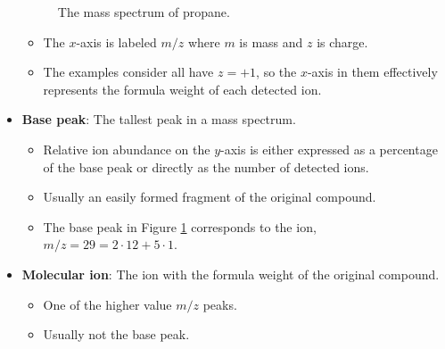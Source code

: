 \documentclass[../notes.tex]{subfiles}
\begin{document}
\begin{itemize}
\begin{figure}[h!]
        \caption{The mass spectrum of propane.}
        \label{fig:MSpropane}
    \end{figure}
    \begin{itemize}
        \item The $x$-axis is labeled $m/z$ where $m$ is mass and $z$ is charge.
        \item The examples \textcite{bib:SolomonsEtAl} consider all have $z=+1$, so the $x$-axis in them effectively represents the formula weight of each detected ion.
    \end{itemize}
    \item \textbf{Base peak}: The tallest peak in a mass spectrum.
    \begin{itemize}
        \item Relative ion abundance on the $y$-axis is either expressed as a percentage of the base peak or directly as the number of detected ions.
        \item Usually an easily formed fragment of the original compound.
        \item The base peak in Figure \ref{fig:MSpropane} corresponds to the  ion, $m/z=29=2\cdot 12+5\cdot 1$.
    \end{itemize}
    \item \textbf{Molecular ion}: The ion with the formula weight of the original compound.
    \begin{itemize}
        \item One of the higher value $m/z$ peaks.
        \item Usually not the base peak.

\end{itemize}
\end{itemize}
\end{document}
